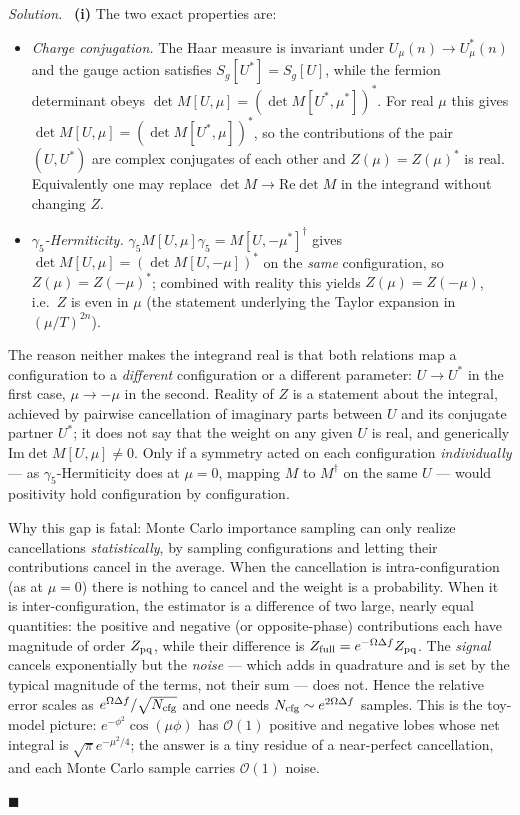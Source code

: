 \documentclass[11pt]{article}
\newenvironment{solution}{\par\smallskip\noindent\textit{Solution.}\ }{\hfill$\blacksquare$\par\smallskip}
\begin{document}
\begin{solution}
\textbf{(i)} The two exact properties are:
\begin{itemize}
  \item \emph{Charge conjugation.} The Haar measure is invariant under $U_\mu(n) \to U_\mu^*(n)$ and the gauge action satisfies $S_g[U^*] = S_g[U]$, while the fermion determinant obeys $\det M[U,\mu] = (\det M[U^*,\mu^*])^*$. For real $\mu$ this gives $\det M[U,\mu] = (\det M[U^*,\mu])^*$, so the contributions of the pair $(U, U^*)$ are complex conjugates of each other and $Z(\mu) = Z(\mu)^*$ is real. Equivalently one may replace $\det M \to \mathrm{Re}\det M$ in the integrand without changing $Z$.
  \item \emph{$\gamma_5$-Hermiticity.} $\gamma_5 M[U,\mu]\gamma_5 = M[U,-\mu^*]^\dagger$ gives $\det M[U,\mu] = (\det M[U,-\mu])^*$ on the \emph{same} configuration, so $Z(\mu) = Z(-\mu)^*$; combined with reality this yields $Z(\mu) = Z(-\mu)$, i.e.\ $Z$ is even in $\mu$ (the statement underlying the Taylor expansion in $(\mu/T)^{2n}$).
\end{itemize}
The reason neither makes the integrand real is that both relations map a configuration to a \emph{different} configuration or a different parameter: $U \to U^*$ in the first case, $\mu \to -\mu$ in the second. Reality of $Z$ is a statement about the integral, achieved by pairwise cancellation of imaginary parts between $U$ and its conjugate partner $U^*$; it does not say that the weight on any given $U$ is real, and generically $\mathrm{Im}\det M[U,\mu]\neq0$. Only if a symmetry acted on each configuration \emph{individually} --- as $\gamma_5$-Hermiticity does at $\mu = 0$, mapping $M$ to $M^\dagger$ on the same $U$ --- would positivity hold configuration by configuration.

Why this gap is fatal: Monte Carlo importance sampling can only realize cancellations \emph{statistically}, by sampling configurations and letting their contributions cancel in the average. When the cancellation is intra-configuration (as at $\mu=0$) there is nothing to cancel and the weight is a probability. When it is inter-configuration, the estimator is a difference of two large, nearly equal quantities: the positive and negative (or opposite-phase) contributions each have magnitude of order $Z_{\rm pq}$, while their difference is $Z_{\rm full} = e^{-\Omega\Delta f}Z_{\rm pq}$. The \emph{signal} cancels exponentially but the \emph{noise} --- which adds in quadrature and is set by the typical magnitude of the terms, not their sum --- does not. Hence the relative error scales as $e^{\Omega\Delta f}/\sqrt{N_{\rm cfg}}$ and one needs $N_{\rm cfg}\sim e^{2\Omega\Delta f}$ samples. This is the toy-model picture: $e^{-\phi^2}\cos(\mu\phi)$ has $\mathcal{O}(1)$ positive and negative lobes whose net integral is $\sqrt\pi e^{-\mu^2/4}$; the answer is a tiny residue of a near-perfect cancellation, and each Monte Carlo sample carries $\mathcal{O}(1)$ noise.


\end{solution}
\end{document}
